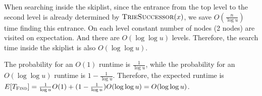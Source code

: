 \documentclass{article}
\begin{document}
When searching inside the skiplist, since the entrance from the top level to the second level is already determined by $\textsc{TrieSuccessor}(x)$, we save $O(\frac{n}{\log u})$ time finding this entrance. On each level constant number of nodes (2 nodes) are visited on expectation. And there are $O(\log\log u)$ levels. Therefore, the search time inside the skiplist is also $O(\log\log u)$.

The probability for an $O(1)$ runtime is $\frac{1}{\log u}$, while the probability for an $O(\log\log u)$ runtime is $1-\frac{1}{\log u}$. Therefore, the expected runtime is $E[T_\textsc{Find}]=\frac{1}{\log u}O(1)+(1-\frac{1}{\log u})O(\log\log u)=O(\log\log u)$.
\end{document}
